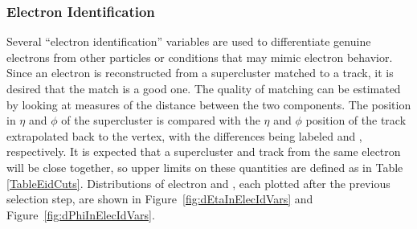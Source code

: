 

\subsubsection{Electron Identification}
\label{evSel:eid}
Several ``electron identification'' variables are used to differentiate genuine electrons  %
from other particles or conditions that may mimic electron behavior.  
Since an electron is reconstructed from a supercluster matched to a track, it is desired that the match is a good one.
The quality of matching can be estimated by looking at measures of the distance between the two components.
The position in $ \eta $ and $ \phi $ of the supercluster is compared with 
the $ \eta $ and $ \phi $ position of the track extrapolated back to the vertex, 
with the differences being labeled \detain and \dphiin, respectively.  
It is expected that a supercluster and track from the same electron will be close together, 
so upper limits on these quantities are defined as in Table \ref{TableEidCuts}.  
Distributions of electron \detain and \dphiin, 
each plotted after the previous selection step,%
are shown in Figure~\ref{fig:dEtaInElecIdVars} and 
Figure~\ref{fig:dPhiInElecIdVars}.  


